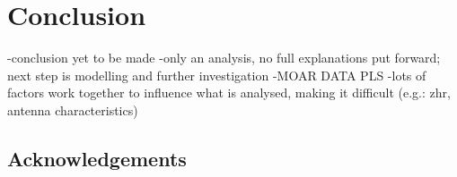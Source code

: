 \chapter{Conclusion}
-conclusion yet to be made
-only an analysis, no full explanations put forward; next step is modelling and further investigation
-MOAR DATA PLS
-lots of factors work together to influence what is analysed, making it difficult (e.g.: zhr, antenna characteristics)
\section{Acknowledgements}